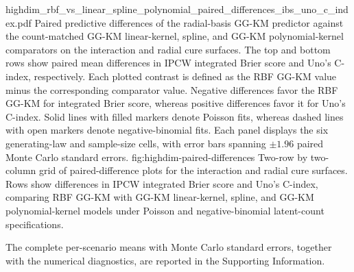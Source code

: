 \GGKMWideFigure
{highdim_rbf_vs_linear_spline_polynomial_paired_differences_ibs_uno_c_index.pdf}
{Paired predictive differences of the radial-basis GG-KM predictor against the count-matched GG-KM linear-kernel, spline, and GG-KM polynomial-kernel comparators on the interaction and radial cure surfaces. The top and bottom rows show paired mean differences in IPCW integrated Brier score and Uno's C-index, respectively. Each plotted contrast is defined as the RBF GG-KM value minus the corresponding comparator value. Negative differences favor the RBF GG-KM for integrated Brier score, whereas positive differences favor it for Uno's C-index. Solid lines with filled markers denote Poisson fits, whereas dashed lines with open markers denote negative-binomial fits. Each panel displays the six generating-law and sample-size cells, with error bars spanning $\pm1.96$ paired Monte Carlo standard errors.}
{fig:highdim-paired-differences}
{Two-row by two-column grid of paired-difference plots for the interaction and radial cure surfaces. Rows show differences in IPCW integrated Brier score and Uno's C-index, comparing RBF GG-KM with GG-KM linear-kernel, spline, and GG-KM polynomial-kernel models under Poisson and negative-binomial latent-count specifications.}

The complete per-scenario means with Monte Carlo standard errors, together with the numerical diagnostics, are
reported in the Supporting Information.
